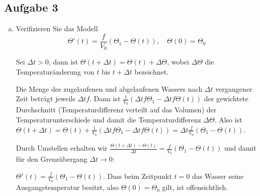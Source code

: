 \documentclass[11pt,a4paper,ngerman]{article}
\begin{document}
\subsection*{Aufgabe 3}
\begin{enumerate}[a)]
\item Verifizieren Sie das  Modell
$$ \Theta'(t) = \frac{f}{V_0}(\Theta_1 - \Theta(t)), \quad \Theta(0) = \Theta_0$$ 

Sei $\Delta t > 0$, dann ist $\Theta(t + \Delta t) = \Theta(t) + \Delta \Theta$, wobei $\Delta \Theta$ die Temperaturänderung von $t$ bis $t + \Delta t$ bezeichnet.

Die Menge des zugelaufenen und abgelaufenen Wassers nach $\Delta t$ vergangener Zeit beträgt jeweils $\Delta t f$. Dann ist $\frac{1}{V_0}(\Delta t f \Theta_1 - \Delta t f \Theta(t))$ der gewichtete Durchschnitt (Temperaturdifferenz verteilt auf das Volumen) der Temperaturunterschiede und damit die Temperaturdifferenz $\Delta \Theta$. Also ist $\Theta(t + \Delta t) = \Theta(t) + \frac{1}{V_0}(\Delta t f \Theta_1 - \Delta t f \Theta(t)) = \Delta t \frac{f}{V_0} (\Theta_1 - \Theta(t))$.

Durch Umstellen erhalten wir $\frac{\Theta(t + \Delta t) - \Theta(t)}{\Delta t} = \frac{f}{V_0} (\Theta_1 - \Theta(t))$ und damit für den Grenzübergang $\Delta t \to 0$:

$\Theta'(t) = \frac{f}{V_0} (\Theta_1 - \Theta(t))$. Dass beim Zeitpunkt $t= 0$ das Wasser seine Ausgangstemperatur besitzt, also $\Theta(0) = \Theta_0$ gilt, ist offensichtlich.


\end{enumerate}
\end{document}
